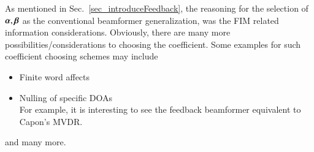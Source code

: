 As mentioned in Sec.~\ref{sec_introduceFeedback}, the reasoning for the selection of $\boldsymbol{\alpha}, \boldsymbol{\beta}$ as the conventional beamformer generalization, was the FIM related information considerations.
Obviously, there are many more possibilities/considerations to choosing the coefficient.
Some examples for such coefficient choosing schemes may include
\begin{itemize}
    \item Finite word affects
    \item Nulling of specific DOAs \\
    For example, it is interesting to see the feedback beamformer equivalent to Capon's \cite{capon1969high} MVDR. 
\end{itemize}
and many more.